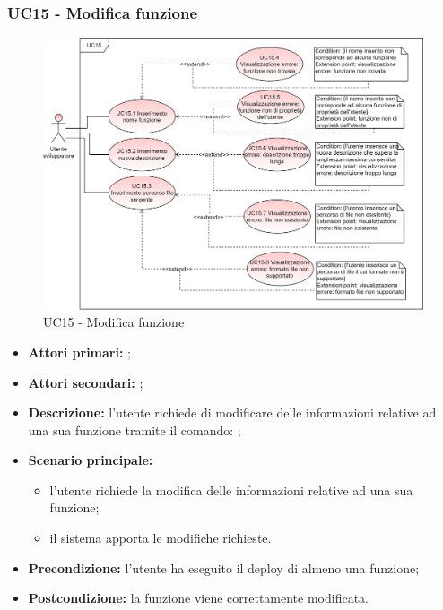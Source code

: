 \subsubsection{UC15 - Modifica funzione }
\begin{figure}[H]
	\centering
	\includegraphics[scale=\ucs]{./res/img/UC15.png}
	\caption {UC15 - Modifica funzione }
\end{figure}
\begin{itemize}
	\item \textbf{Attori primari:} \us{};
	\item \textbf{Attori secondari:} \re{};
	\item \textbf{Descrizione:} l’utente richiede di modificare delle informazioni relative ad una sua funzione tramite il comando: \pedit{};
	\item \textbf{Scenario principale:} 
	\begin{itemize}
		\item l’utente richiede la modifica delle informazioni relative ad una sua funzione;
		\item il sistema apporta le modifiche richieste.  
	\end{itemize}
	\item \textbf{Precondizione:} l’utente ha eseguito il deploy di almeno una funzione;
	\item \textbf{Postcondizione:} la funzione viene correttamente modificata. 
\end{itemize}